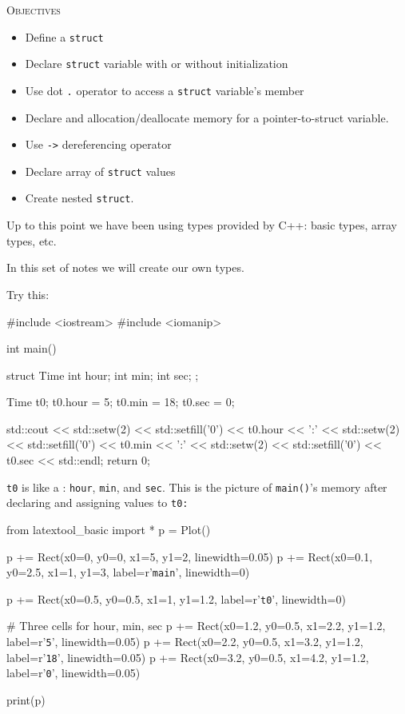 \newpage{}

\textsc{Objectives}
\begin{itemize}
\item Define a \texttt{struct}
\item Declare \texttt{struct} variable with or without initialization
\item Use dot \texttt{.} operator to access a \texttt{struct} variable's member
\item Declare and allocation/deallocate memory for a pointer-to-struct variable.
\item Use \texttt{->} dereferencing operator
\item Declare array of \texttt{struct} values
\item Create nested \texttt{struct}.
\end{itemize}

Up to this point we have been using types provided by C++: basic types, array types, etc.

In this set of notes we will create our own types.


\newpage{}

Try this:

\begin{consolethree}[escapeinside=||]
#include <iostream>
#include <iomanip>

int main()
{
    struct Time
    {
        int hour;
        int min;
        int sec;
    };

    Time t0;
    t0.hour = 5;
    t0.min = 18;
    t0.sec = 0;

    std::cout << std::setw(2) << std::setfill('0')
              << t0.hour << ':'
              << std::setw(2) << std::setfill('0')
              << t0.min << ':'
              << std::setw(2) << std::setfill('0')
              << t0.sec
              << std::endl;
    return 0;
}
\end{consolethree}

\texttt{t0} is like a :
\texttt{hour}, \texttt{min}, and \texttt{sec}. This is the picture of
\texttt{main()}'s memory after declaring and assigning
values to \texttt{t0:}

\begin{python}
from latextool_basic import *
p = Plot()

p += Rect(x0=0, y0=0, x1=5, y1=2, linewidth=0.05)
p += Rect(x0=0.1, y0=2.5, x1=1, y1=3, label=r'{\tt main}', linewidth=0)

p += Rect(x0=0.5, y0=0.5, x1=1, y1=1.2, label=r'{\tt t0}', linewidth=0)

# Three cells for hour, min, sec
p += Rect(x0=1.2, y0=0.5, x1=2.2, y1=1.2, label=r'{\tt 5}', linewidth=0.05)
p += Rect(x0=2.2, y0=0.5, x1=3.2, y1=1.2, label=r'{\tt 18}', linewidth=0.05)
p += Rect(x0=3.2, y0=0.5, x1=4.2, y1=1.2, label=r'{\tt 0}', linewidth=0.05)

print(p)
\end{python}

